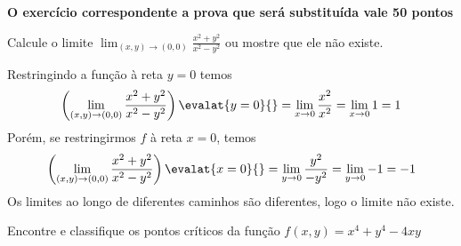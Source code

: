 \documentclass[a4paper,12pt,fleqn]{article}
\begin{document}

\textbf{O exercício correspondente a prova que será substituída vale 50 pontos}

Calcule o limite
\(
  \lim_{(x, y) \to (0, 0)} \frac{x^2 + y^2}{x^2 - y^2}
\)
ou mostre que ele não existe.

\begin{answer}
  Restringindo a função à reta \( y = 0 \) temos
  \[
    \left(\lim_{(x, y) \to (0, 0)} \frac{x^2 + y^2}{x^2 - y^2}\right) \evalat{y=0}{}
    = \lim_{x\to 0} \frac{x^2}{x^2}
    = \lim_{x\to 0} 1
    = 1
  \]
  Porém, se restringirmos $f$ à reta \( x = 0 \), temos
  \[
    \left(\lim_{(x, y) \to (0, 0)} \frac{x^2 + y^2}{x^2 - y^2}\right) \evalat{x=0}{}
    = \lim_{y\to 0} \frac{y^2}{-y^2}
    = \lim_{y\to 0} -1
    = -1
  \]
  Os limites ao longo de diferentes caminhos são diferentes, logo o limite não existe.
  \clearpage
\end{answer}

Encontre e classifique os pontos críticos da função
\(
  f(x, y) = x^4 + y^4 - 4xy
\)
\end{document}
